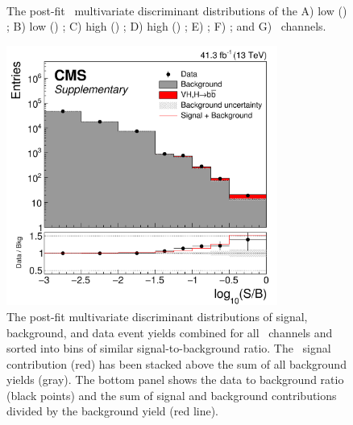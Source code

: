 \begin{figure}[htbp]
{     \qquad
  }
  \mbox{
  }
  \caption[\VHbb\ Signal Region Distributions]{The post-fit \VHbb\ multivariate discriminant distributions of the A) low \pT(\bosV) \ZeeH; B) low \pT(\bosV) \ZmmH; C) high \pT(\bosV) \ZeeH; D) high \pT(\bosV) \ZmmH; E) \WenH; F) \WmnH; and G) \ZnnH\ channels.}
  \label{fig:SRVHbb}
\end{figure}

\begin{figure}[htbp]
  \centering
    \includegraphics[width=3.5in]{images/CMS-HIG-18-016_Figure-aux_008-a}
    \caption[\VHbb\ Combined Signal Region Distribution]{The post-fit multivariate discriminant distributions of signal, background, and data event yields combined for all \VHbb\ channels and sorted into bins of similar signal-to-background ratio. The \VHbb\ signal contribution (red) has been stacked above the sum of all background yields (gray). The bottom panel shows the data to background ratio (black points) and the sum of signal and background contributions divided by the background yield (red line).}
    \label{fig:SBVHbb}
\end{figure}

